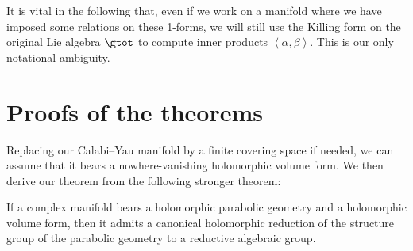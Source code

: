 It is vital in the following that, even if we
work on a manifold where we have imposed some
relations on these 1-forms, we will still use the
Killing form on the original Lie algebra $\gtot$
to compute inner products $\left<\alpha,\beta\right>$.
This is our only notational ambiguity.

\section{Proofs of the theorems}

Replacing our Calabi--Yau manifold by a f\/inite covering space
if needed, we can assume that it
bears a nowhere-vanishing holomorphic volume
form. We then derive our theorem from the following stronger theorem:

\begin{theorem}\label{theorem:Reduction}
If a complex manifold bears a holomorphic parabolic geometry
and a holomorphic volume form, then it admits a canonical
holomorphic reduction of the structure group of the parabolic
geometry to a reductive algebraic group.
\end{theorem}
